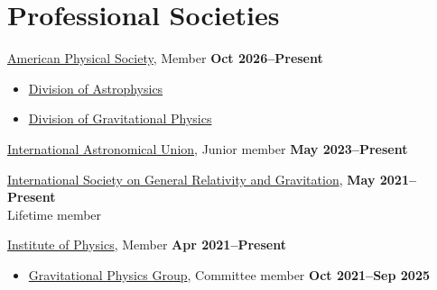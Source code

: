 \section{Professional Societies}

\href{https://www.aps.org/}{American Physical Society}, Member
\hfill \textbf{Oct 2026--Present}%
%
\vspace*{0.05in}
\begin{itemize}
    \item[]
    \href{https://engage.aps.org/dap}{Division of Astrophysics}
    \item[]
    \href{https://engage.aps.org/dgrav}{Division of Gravitational Physics}
\end{itemize}

\href{https://www.iau.org/}{International Astronomical Union}, Junior member
\hfill \textbf{May 2023--Present}

\href{http://www.isgrg.org/}
{International Society on General Relativity and Gravitation},
\hfill \textbf{May 2021--Present} \\
Lifetime member


\href{https://www.iop.org/}{Institute of Physics}, Member
\hfill \textbf{Apr 2021--Present}%
%
\vspace*{0.05in}
\begin{itemize}
    \item[]
    \href{https://www.iop.org/physics-community/special-interest-groups/gravitational-physics-group}
    {Gravitational Physics Group}, Committee member
    \hfill \textbf{Oct 2021--Sep 2025}
\end{itemize}
